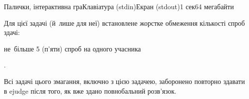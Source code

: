\begin{problem}{Палички, інтерактивна гра}{Клавіатура (stdin)}{Екран (stdout)}{1 сек}{64 мегабайти}



\ifStatementOnly
\vfill\par
Для цієї задачі (й~лише для неї) встановлене жорстке обмеження кількості спроб здачі: \begin{itshape}\begin{bfseries}не~більше 5 (п'яти) спроб на одного учасника\end{bfseries}\end{itshape}.\par
Всі задачі цього змагання, включно з цією задачею, заборонено повторно здавати в ejudge після того, як вже здано повнобальний розв'язок.
\fi

\end{problem}